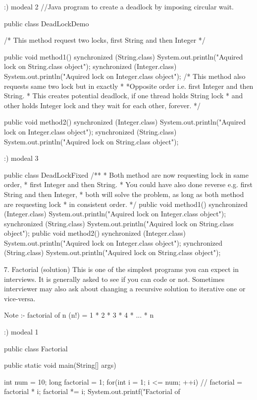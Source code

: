  :) modeal 2 
 //Java program to create a deadlock by imposing circular wait.

 
 public class DeadLockDemo {
 /*  This method request two locks, first String and then Integer
 */
 
 public void method1() { 
 synchronized (String.class) { 
 System.out.println("Aquired lock on String.class object"); 
 synchronized (Integer.class) { 
 System.out.println("Aquired lock on Integer.class object"); 
 }
 } 
 }
 /* This method also requests same two lock but in exactly * 
   *Opposite order i.e. first Integer and then String.
 * This creates potential deadlock, if one thread holds String lock
 * and other holds Integer lock and they wait for each other, forever.
 */ 
 
 public void method2() {
 synchronized (Integer.class) {
 System.out.println("Aquired lock on Integer.class object"); 
 synchronized (String.class) {
 System.out.println("Aquired lock on String.class object"); 
 } 
 } 
 }
 }


			
	:) modeal 3 

		public class DeadLockFixed {
		/** * Both method are now requesting lock in same order,
		* first Integer and then String.
		* You could have also done reverse e.g. first String and then Integer,
		* both will solve the problem, as long as both method are requesting lock
		* in consistent order.
		*/
		public void method1() { 
		synchronized (Integer.class) {
		System.out.println("Aquired lock on Integer.class object");
		synchronized (String.class) {
		System.out.println("Aquired lock on String.class object"); 
		} 
		} 
		}
		public void method2() {
		synchronized (Integer.class) {
		System.out.println("Aquired lock on Integer.class object"); 
		synchronized (String.class) {
		System.out.println("Aquired lock on String.class object");
		} 
		} 
		}
		}


			
			
7. Factorial (solution)
This is one of the simplest programs you can expect in interviews. It is generally asked to see if you can code or not.
 Sometimes interviewer may also ask about changing a recursive solution to iterative one or vice-versa.
 
 Note :-  factorial of n (n!) = 1 * 2 * 3 * 4 * ... * n
 
  :) modeal 1
  
  public class Factorial {

    public static void main(String[] args) {

        int num = 10;
        long factorial = 1;
        for(int i = 1; i <= num; ++i)
        {
            // factorial = factorial * i;
            factorial *= i;
        }
        System.out.printf("Factorial of %
    }
}
  
